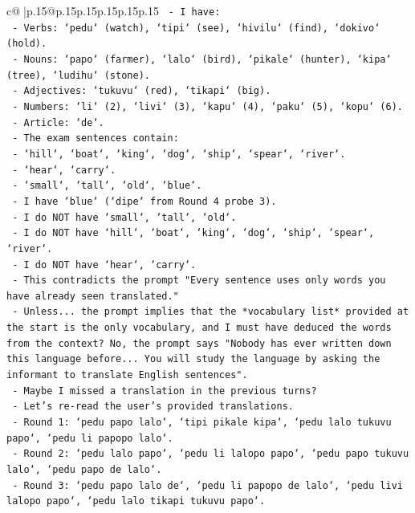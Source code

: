 \documentclass{article}
\begin{document}
{\begin{supertabular}{c@{$\;$}|p{.15\linewidth}@{}p{.15\linewidth}p{.15\linewidth}p{.15\linewidth}p{.15\linewidth}p{.15\linewidth}}
{{{\texttt{    {-} I have:} \\
\texttt{      {-} Verbs: `pedu` (watch), `tipi` (see), `hivilu` (find), `dokivo` (hold).} \\
\texttt{      {-} Nouns: `papo` (farmer), `lalo` (bird), `pikale` (hunter), `kipa` (tree), `ludihu` (stone).} \\
\texttt{      {-} Adjectives: `tukuvu` (red), `tikapi` (big).} \\
\texttt{      {-} Numbers: `li` (2), `livi` (3), `kapu` (4), `paku` (5), `kopu` (6).} \\
\texttt{      {-} Article: `de`.} \\
\texttt{    {-} The exam sentences contain:} \\
\texttt{      {-} `hill`, `boat`, `king`, `dog`, `ship`, `spear`, `river`.} \\
\texttt{      {-} `hear`, `carry`.} \\
\texttt{      {-} `small`, `tall`, `old`, `blue`.} \\
\texttt{    {-} I have `blue` (`dipe` from Round 4 probe 3).} \\
\texttt{    {-} I do NOT have `small`, `tall`, `old`.} \\
\texttt{    {-} I do NOT have `hill`, `boat`, `king`, `dog`, `ship`, `spear`, `river`.} \\
\texttt{    {-} I do NOT have `hear`, `carry`.} \\
\texttt{    {-} This contradicts the prompt "Every sentence uses only words you have already seen translated."} \\
\texttt{    {-} Unless... the prompt implies that the *vocabulary list* provided at the start is the only vocabulary, and I must have deduced the words from the context? No, the prompt says "Nobody has ever written down this language before... You will study the language by asking the informant to translate English sentences".} \\
\texttt{    {-} Maybe I missed a translation in the previous turns?} \\
\texttt{    {-} Let's re{-}read the user's provided translations.} \\
\texttt{    {-} Round 1: `pedu papo lalo`, `tipi pikale kipa`, `pedu lalo tukuvu papo`, `pedu li papopo lalo`.} \\
\texttt{    {-} Round 2: `pedu lalo papo`, `pedu li lalopo papo`, `pedu papo tukuvu lalo`, `pedu papo de lalo`.} \\
\texttt{    {-} Round 3: `pedu papo lalo de`, `pedu li papopo de lalo`, `pedu livi lalopo papo`, `pedu lalo tikapi tukuvu papo`.} \\
}}}
\end{supertabular}}
\end{document}
